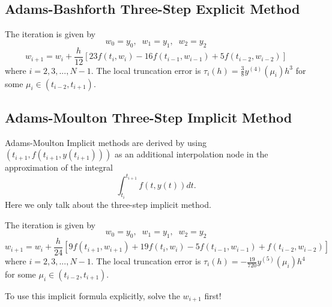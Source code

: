 \subsection*{Adams-Bashforth Three-Step Explicit Method}
\begin{thm}
	The iteration is given by
\[ w_0 = y_0,\;\; w_1 = y_1,\;\; w_2 = y_2 \]
\[ w_{i+1} = w_i + \frac{h}{12}[23f(t_i, w_i ) - 16f(t_{i-1}, w_{i-1}) + 5f(t_{i-2}, w_{i-2})] \]
where $i = 2, 3,... , N - 1$. The local truncation error is $\tau_i(h) = \frac{3}{8}y^{(4)}(\mu_i)h^3$ for some $\mu_i\in(t_{i-2},t_{i+1})$. 
\end{thm}

\subsection*{Adams-Moulton Three-Step Implicit Method}
Adams-Moulton Implicit methods are derived by using $(t_{i+1}, f(t_{i+1}, y(t_{i+1})))$ as an additional interpolation node in the approximation of the integral
\[ \int_{t_i}^{t_{i+1}} f(t,y(t))dt. \]
Here we only talk about the three-step implicit method.
\begin{thm}
	The iteration is given by
	\[ w_0 = y_0,\;\; w_1 = y_1,\;\; w_2 = y_2 \]
	\[ w_{i+1} = w_i + \frac{h}{24}[9f(t_{i+1}, w_{i+1} ) + 19f(t_i, w_i ) - 5f(t_{i-1}, w_{i-1}) + f(t_{i-2}, w_{i-2})] \]
	where $i = 2, 3,... , N - 1$. The local truncation error is $\tau_i(h) = -\frac{19}{720}y^{(5)}(\mu_i)h^4$ for some $\mu_i\in(t_{i-2},t_{i+1})$. 
\end{thm}

\begin{warning}
	To use this implicit formula explicitly, solve the $w_{i+1}$ first!
\end{warning}


